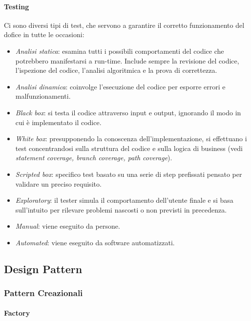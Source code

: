 \documentclass{article}
\begin{document}
        \paragraph{Testing} Ci sono diversi tipi di test, che servono a garantire il  corretto funzionamento del dofice in tutte le occasioni:
            \begin{itemize}
                    \item \textit{Analisi statica}: esamina tutti i possibili comportamenti del codice che potrebbero manifestarsi a run-time. Include sempre la revisione del codice, l'ispezione del codice, l'analisi algoritmica e la prova di correttezza.
                    \item \textit{Analisi dinamica}: coinvolge l'esecuzione del codice per esporre errori e malfunzionamenti.
                    \item \textit{Black box}: si testa il codice attraverso input e output, ignorando il modo in cui è implementato il codice.
                    \item \textit{White box}: presupponendo la conoscenza dell'implementazione, si effettuano i test concentrandosi sulla struttura del codice e sulla logica di business (vedi \textit{statement coverage, branch coverage, path coverage}). 
                    \item \textit{Scripted box}: specifico test basato su una serie di step prefissati pensato per validare un preciso requisito.
                    \item \textit{Exploratory}: il tester simula il comportamento dell'utente finale e si basa sull'intuito per rilevare problemi nascosti o non previsti in precedenza.
                    \item \textit{Manual}: viene eseguito da persone.
                    \item \textit{Automated}: viene eseguito da software automatizzati.
                \end{itemize}

    \subsection{Design Pattern}
        \subsubsection{Pattern Creazionali}
            \paragraph{Factory}
\end{document}
